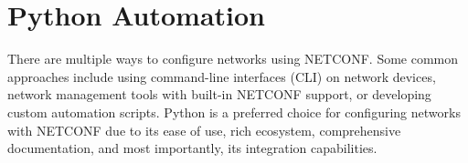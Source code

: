 \section{Python Automation}


There are multiple ways to configure networks using NETCONF. Some common approaches include using command-line interfaces (CLI) on network devices, network management tools with built-in NETCONF support, or developing custom automation scripts. Python is a preferred choice for configuring networks with NETCONF due to its ease of use, rich ecosystem, comprehensive documentation, and most importantly, its integration capabilities.

